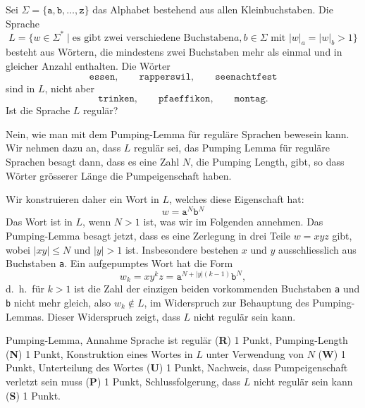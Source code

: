 Sei $\Sigma=\{\texttt{a},\texttt{b},\dots,\texttt{z}\}$ das Alphabet bestehend
aus allen Kleinbuchstaben.
Die Sprache
\[
L=\{w\in\Sigma^*\;|\;\text{es gibt zwei verschiedene Buchstaben
$a,b\in\Sigma$ mit $|w|_a=|w|_b > 1$}\}
\]
besteht aus Wörtern, die mindestens zwei Buchstaben mehr als einmal
und in gleicher Anzahl enthalten.
Die Wörter
\[
\texttt{essen},\qquad
\texttt{rapperswil},\qquad
\texttt{seenachtfest}
\]
sind in $L$, nicht aber
\[
\texttt{trinken},\qquad
\texttt{pfaeffikon},\qquad
\texttt{montag}.
\]
Ist die Sprache $L$ regulär?

\begin{loesung}
Nein, wie man mit dem Pumping-Lemma für reguläre Sprachen bewesein kann.
Wir nehmen dazu an, dass $L$ regulär sei, das Pumping Lemma für reguläre
Sprachen besagt dann, dass es eine Zahl $N$, die Pumping Length, gibt,
so dass Wörter grösserer Länge die Pumpeigenschaft haben.

Wir konstruieren daher ein Wort in $L$, welches diese Eigenschaft hat:
\[
w=\texttt{a}^N\texttt{b}^N
\]
Das Wort ist in $L$, wenn $N>1$ ist, was wir im Folgenden annehmen.
Das Pumping-Lemma besagt jetzt, dass es eine Zerlegung in drei 
Teile $w=xyz$ gibt, wobei $|xy|\le N$ und $|y|>1$ ist.
Insbesondere bestehen $x$ und $y$ ausschliesslich aus Buchstaben \texttt{a}.
Ein aufgepumptes Wort hat die Form
\[
w_k=xy^kz=\texttt{a}^{N+|y|(k-1)}\texttt{b}^N,
\]
d.~h.~für $k>1$ ist die Zahl der einzigen beiden vorkommenden Buchstaben
\texttt{a} und \texttt{b} nicht mehr gleich, also $w_k\not\in L$,
im Widerspruch zur Behauptung des Pumping-Lemmas.
Dieser Widerspruch zeigt, dass $L$ nicht regulär sein kann.
\end{loesung}

\begin{bewertung}
Pumping-Lemma, Annahme Sprache ist regulär ({\bf R}) 1 Punkt,
Pumping-Length ({\bf N}) 1 Punkt,
Konstruktion eines Wortes in $L$ unter Verwendung von $N$ ({\bf W}) 1 Punkt,
Unterteilung des Wortes ({\bf U}) 1 Punkt,
Nachweis, dass Pumpeigenschaft verletzt sein muss ({\bf P}) 1 Punkt,
Schlussfolgerung, dass $L$ nicht regulär sein kann ({\bf S}) 1 Punkt.
\end{bewertung}

